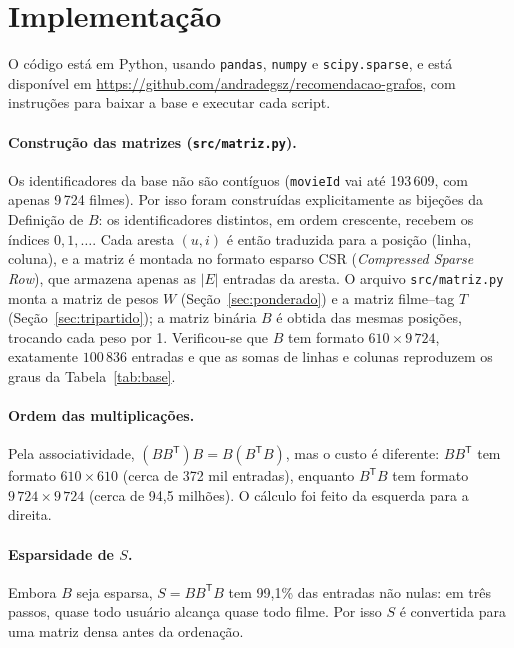 \documentclass[12pt,a4paper]{article}
\theoremstyle{definition}
\begin{document}
\section{Implementação}\label{sec:implementacao}

O código está em Python, usando \texttt{pandas}, \texttt{numpy} e
\texttt{scipy.sparse}, e está disponível em
\url{https://github.com/andradegsz/recomendacao-grafos}, com instruções
para baixar a base e executar cada script.

\paragraph{Construção das matrizes (\texttt{src/matriz.py}).}
Os identificadores da base não são contíguos (\texttt{movieId} vai até
193\,609, com apenas 9\,724 filmes). Por isso foram construídas explicitamente as
bijeções da Definição de $B$: os identificadores distintos, em ordem
crescente, recebem os índices $0, 1, \dots$. Cada aresta $(u, i)$ é então
traduzida para a posição (linha, coluna), e a matriz é montada no formato
esparso CSR (\emph{Compressed Sparse Row}), que armazena apenas as $|E|$
entradas da aresta. O arquivo \texttt{src/matriz.py} monta a matriz de
pesos $W$ (Seção~\ref{sec:ponderado}) e a matriz filme--tag $T$
(Seção~\ref{sec:tripartido}); a matriz binária $B$ é obtida das mesmas
posições, trocando cada peso por 1. Verificou-se que $B$ tem formato
$610 \times 9\,724$, exatamente $100\,836$ entradas e que as somas de
linhas e colunas reproduzem os graus da Tabela~\ref{tab:base}.

\paragraph{Ordem das multiplicações.}
Pela associatividade, $(BB^{\mathsf T})B = B(B^{\mathsf T}B)$, mas o custo é
diferente: $BB^{\mathsf T}$ tem formato $610 \times 610$ (cerca de 372 mil
entradas), enquanto $B^{\mathsf T}B$ tem formato $9\,724 \times 9\,724$
(cerca de 94{,}5 milhões). O cálculo foi feito da esquerda para a direita.

\paragraph{Esparsidade de $S$.}
Embora $B$ seja esparsa, $S = BB^{\mathsf T}B$ tem 99{,}1\% das entradas não
nulas: em três passos, quase todo usuário alcança quase todo filme. Por isso
$S$ é convertida para uma matriz densa antes da ordenação.
\end{document}
